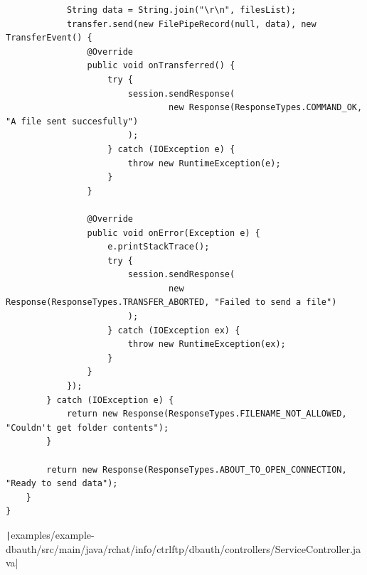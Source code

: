 \documentclass[a4paper,14pt]{extarticle}
\begin{document}
\begin{verbatim}
            String data = String.join("\r\n", filesList);
            transfer.send(new FilePipeRecord(null, data), new TransferEvent() {
                @Override
                public void onTransferred() {
                    try {
                        session.sendResponse(
                                new Response(ResponseTypes.COMMAND_OK, "A file sent succesfully")
                        );
                    } catch (IOException e) {
                        throw new RuntimeException(e);
                    }
                }

                @Override
                public void onError(Exception e) {
                    e.printStackTrace();
                    try {
                        session.sendResponse(
                                new Response(ResponseTypes.TRANSFER_ABORTED, "Failed to send a file")
                        );
                    } catch (IOException ex) {
                        throw new RuntimeException(ex);
                    }
                }
            });
        } catch (IOException e) {
            return new Response(ResponseTypes.FILENAME_NOT_ALLOWED, "Couldn't get folder contents");
        }

        return new Response(ResponseTypes.ABOUT_TO_OPEN_CONNECTION, "Ready to send data");
    }
}
\end{verbatim}
\texttt|examples/example-dbauth/src/main/java/rchat/info/ctrlftp/dbauth/controllers/ServiceController.java|
\end{document}
